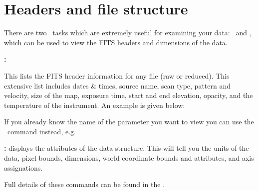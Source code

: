 \documentclass[11pt,oneside,chapters]{starlink}
\begin{document}
\section{Headers and file structure}
\label{sec:fitsheader}

There are two \Kappa\ tasks which are extremely useful for examining
your data: \fitslist\ and \ndftrace, which can be used to view the
FITS headers and dimensions of the data.


\begin{aligndesc}
\item[\textbf{\task{fitslist}:}]

This lists the FITS header information
for any file (raw or reduced). This extensive list includes dates \& times,
source name, scan type, pattern and velocity, size of the map, exposure
time, start and end elevation, opacity, and the temperature of the
instrument. An example is given below:
\begin{terminalv}
\end{terminalv}

If you already know the name of the parameter you want to view you can
use the \fitsval\ command instead, e.g.%
\begin{terminalv}
\end{terminalv}

\item[\textbf{\task{ndftrace}:}]
 displays the attributes of the data structure. This will tell
you the units of the data, pixel bounds, dimensions, world coordinate
bounds and attributes, and axis assignations.
\begin{terminalv}
\end{terminalv}

\end{aligndesc}


Full details of these commands can be found in the .
\end{document}

